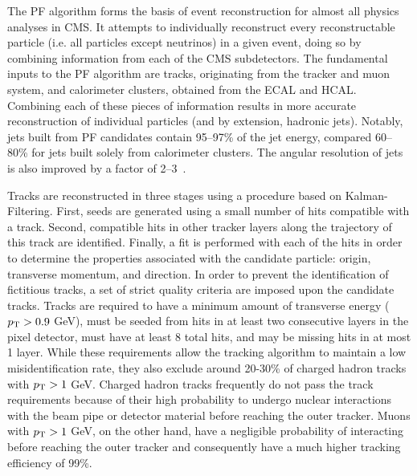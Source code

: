 The PF algorithm forms the basis of event reconstruction for almost all physics analyses in CMS.
It attempts to individually reconstruct every reconstructable particle (i.e. all particles except neutrinos) in a given event, doing so by combining information from each of the CMS subdetectors.
The fundamental inputs to the PF algorithm are tracks, originating from the tracker and muon system, and calorimeter clusters, obtained from the ECAL and HCAL.
Combining each of these pieces of information results in more accurate reconstruction of individual particles (and by extension, hadronic jets).
Notably, jets built from PF candidates contain 95--97\% of the jet energy, compared 60--80\% for jets built solely from calorimeter clusters.
The angular resolution of jets is also improved by a factor of 2--3~\cite{beaudette2014:Brient:2013hsa}.

Tracks are reconstructed in three stages using a procedure based on Kalman-Filtering.
First, seeds are generated using a small number of hits compatible with a track.
Second, compatible hits in other tracker layers along the trajectory of this track are identified.
Finally, a fit is performed with each of the hits in order to determine the properties associated with the candidate particle: origin, transverse momentum, and direction.
In order to prevent the identification of fictitious tracks, a set of strict quality criteria are imposed upon the candidate tracks.
Tracks are required to have a minimum amount of transverse energy ($p_{\mathrm{T}} > 0.9$ GeV), must be seeded from hits in at least two consecutive layers in the pixel detector, must have at least 8 total hits, and may be missing hits in at most 1 layer.
While these requirements allow the tracking algorithm to maintain a low misidentification rate, they also exclude around 20-30\% of charged hadron tracks with $p_{\mathrm{T}} > 1$ GeV.
Charged hadron tracks frequently do not pass the track requirements because of their high probability to undergo nuclear interactions with the beam pipe or detector material before reaching the outer tracker.
Muons with $p_{\mathrm{T}} > 1$ GeV, on the other hand, have a negligible probability of interacting before reaching the outer tracker and consequently have a much higher tracking efficiency of 99\%.

